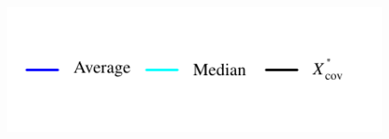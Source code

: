 \documentclass[11pt]{article}
\theoremstyle{definition}
\theoremstyle{definition}
\begin{document}
\begin{figure}[t!]
\captionsetup{width=0.48\textwidth}
\vspace{-2em}
        \centering
        \begin{minipage}[b]{0.495\textwidth}
	\hspace*{1em} 	\includegraphics[width=\textwidth]{legendPoints.pdf} %
	\vspace{-5em}


\end{minipage}
\end{figure}
\end{document}
